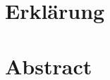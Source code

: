 \documentclass [
	]{scrbook}	%
\let\oldincludegraphics\includegraphics
\renewcommand{\includegraphics}[2][]{%
  \oldincludegraphics[#1,max width=\linewidth]{#2}}
\begin{document}
\pagestyle{plain}








\frontmatter

\newpage

\hypertarget{erkluxe4rung}{%
\section*{Erklärung}\label{erkluxe4rung}}



\newpage

\hypertarget{abstract}{%
\section*{Abstract}\label{abstract}}






\tableofcontents


\mainmatter	%
\pagestyle{scrheadings}
\renewcommand{\chaptermark}[1]{\markboth{\thechapter\hspace{1cm}#1}{}}	%
\chead{}		%
\ihead{\leftmark}	%
\renewcommand{\headfont}{\bfseries}	%
\setheadsepline{0.5pt}
\end{document}

